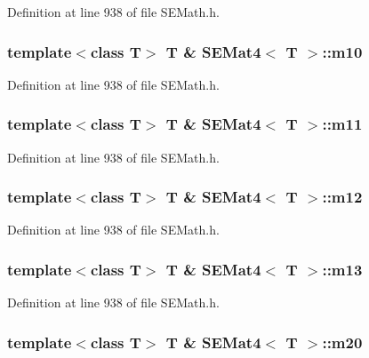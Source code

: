 Definition at line 938 of file S\+E\+Math.\+h.

\subsubsection[{m10}]{\setlength{\rightskip}{0pt plus 5cm}template$<$class T$>$ T \& {\bf S\+E\+Mat4}$<$ T $>$\+::m10}\label{class_s_e_mat4_add7ed3e21843459604282fff148ba3ce}


Definition at line 938 of file S\+E\+Math.\+h.

\subsubsection[{m11}]{\setlength{\rightskip}{0pt plus 5cm}template$<$class T$>$ T \& {\bf S\+E\+Mat4}$<$ T $>$\+::m11}\label{class_s_e_mat4_aefe8f2adf3cb006f3cd9995f0ec81c25}


Definition at line 938 of file S\+E\+Math.\+h.

\subsubsection[{m12}]{\setlength{\rightskip}{0pt plus 5cm}template$<$class T$>$ T \& {\bf S\+E\+Mat4}$<$ T $>$\+::m12}\label{class_s_e_mat4_a8a018e42962b9089ce84ae8554929dc7}


Definition at line 938 of file S\+E\+Math.\+h.

\subsubsection[{m13}]{\setlength{\rightskip}{0pt plus 5cm}template$<$class T$>$ T \& {\bf S\+E\+Mat4}$<$ T $>$\+::m13}\label{class_s_e_mat4_ac72f3150c9c42adfb8037fca254cf8bf}


Definition at line 938 of file S\+E\+Math.\+h.

\subsubsection[{m20}]{\setlength{\rightskip}{0pt plus 5cm}template$<$class T$>$ T \& {\bf S\+E\+Mat4}$<$ T $>$\+::m20}\label{class_s_e_mat4_a990fd1875c9f6a7fd371dd5b09619c8c}


